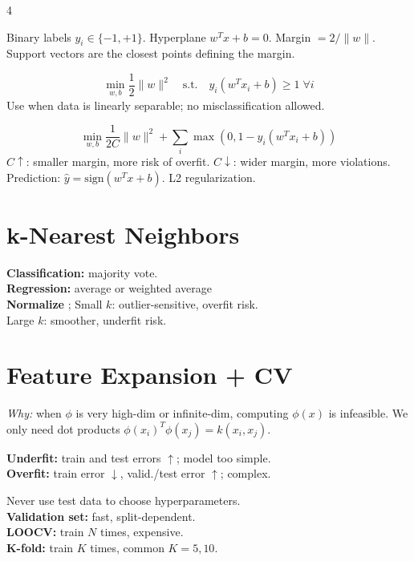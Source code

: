 \documentclass[8pt,a4paper,landscape]{extarticle}
\begin{document}
\begin{multicols*}{4}
\begin{defn}[title=Margin]
Binary labels \(y_i\in\{-1,+1\}\). Hyperplane \(w^Tx+b=0\). Margin \(=2/\|w\|\). Support vectors are the closest points defining the margin.
\end{defn}

\begin{prop}[title=Hard-margin SVM]
\[
\min_{w,b}\frac12\|w\|^2
\quad\text{s.t.}\quad
y_i(w^Tx_i+b)\ge1\;\forall i
\]
Use when data is linearly separable; no misclassification allowed.
\end{prop}

\begin{thm}[title=Hinge Loss]
\[
\min_{w,b}\frac{1}{2C}\|w\|^2+\sum_i\max(0,1-y_i(w^Tx_i+b))
\]
\(C\uparrow\): smaller margin, more risk of overfit. \(C\downarrow\): wider margin, more violations.\\
Prediction: \(\hat y=\mathrm{sign}(w^Tx+b)\). L2 regularization.
\end{thm}

\section{k-Nearest Neighbors}
\begin{prop}[title=No training beyond storing data !]
\textbf{Classification:} majority vote.\\
\textbf{Regression:} average or weighted average\\
\textbf{Normalize} ; Small \(k\): outlier-sensitive, overfit risk. \\Large \(k\): smoother, underfit risk.
\end{prop}

\section{Feature Expansion + CV}
\textit{Why:} when $\phi$ is very high-dim or infinite-dim, computing $\phi(x)$ is infeasible. We only need dot products $\phi(x_i)^T\phi(x_j) = k(x_i,x_j)$.

\begin{defn}[title=Over/Underfitting]
\textbf{Underfit:} train and test errors $\uparrow$; model too simple.\\
\textbf{Overfit:} train error $\downarrow$, valid./test error $\uparrow$; complex.
\end{defn}

\begin{thm}[title=Cross-validation]
Never use test data to choose hyperparameters.\\
\textbf{Validation set:} fast, split-dependent.\\
\textbf{LOOCV:} train \(N\) times, expensive.\\
\textbf{K-fold:} train \(K\) times, common \(K=5,10\).
\end{thm}


\end{multicols*}
\end{document}
